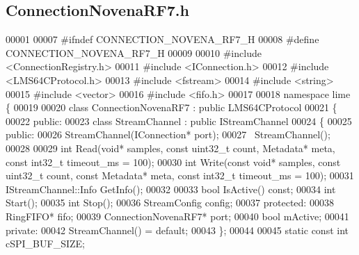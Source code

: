\subsection{Connection\+Novena\+R\+F7.\+h}
\label{ConnectionNovenaRF7_8h_source}

\begin{DoxyCode}
00001 
00007 \textcolor{preprocessor}{#ifndef CONNECTION\_NOVENA\_RF7\_H}
00008 \textcolor{preprocessor}{#define CONNECTION\_NOVENA\_RF7\_H}
00009 
00010 \textcolor{preprocessor}{#include <ConnectionRegistry.h>}
00011 \textcolor{preprocessor}{#include <IConnection.h>}
00012 \textcolor{preprocessor}{#include <LMS64CProtocol.h>}
00013 \textcolor{preprocessor}{#include <fstream>}
00014 \textcolor{preprocessor}{#include <string>}
00015 \textcolor{preprocessor}{#include <vector>}
00016 \textcolor{preprocessor}{#include <fifo.h>}
00017 
00018 \textcolor{keyword}{namespace }lime \{
00019 
00020 \textcolor{keyword}{class }ConnectionNovenaRF7 : \textcolor{keyword}{public} LMS64CProtocol
00021 \{
00022 \textcolor{keyword}{public}:
00023     \textcolor{keyword}{class }StreamChannel : \textcolor{keyword}{public} IStreamChannel
00024     \{
00025     \textcolor{keyword}{public}:
00026         StreamChannel(IConnection* port);
00027         ~StreamChannel();
00028 
00029         \textcolor{keywordtype}{int} Read(\textcolor{keywordtype}{void}* samples, \textcolor{keyword}{const} uint32\_t count, Metadata* meta, \textcolor{keyword}{const} int32\_t 
      timeout_ms = 100);
00030         \textcolor{keywordtype}{int} Write(\textcolor{keyword}{const} \textcolor{keywordtype}{void}* samples, \textcolor{keyword}{const} uint32\_t count, \textcolor{keyword}{const} Metadata* meta, \textcolor{keyword}{const} int32\_t 
      timeout_ms = 100);
00031         IStreamChannel::Info GetInfo();
00032 
00033         \textcolor{keywordtype}{bool} IsActive() \textcolor{keyword}{const};
00034         \textcolor{keywordtype}{int} Start();
00035         \textcolor{keywordtype}{int} Stop();
00036         StreamConfig config;
00037     \textcolor{keyword}{protected}:
00038         RingFIFO* fifo;
00039         ConnectionNovenaRF7* port;
00040         \textcolor{keywordtype}{bool} mActive;
00041     \textcolor{keyword}{private}:
00042         StreamChannel() = \textcolor{keywordflow}{default};
00043     \};
00044 
00045     \textcolor{keyword}{static} \textcolor{keyword}{const} \textcolor{keywordtype}{int} cSPI_BUF_SIZE;

\end{DoxyCode}
